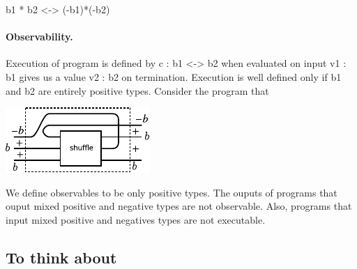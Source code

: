 \documentclass[preprint]{sigplanconf}
\begin{document}
{{b1 * b2 <-> (-b1)*(-b2)}}



\paragraph*{Observability.} 
Execution of program is defined by {{c : b1 <-> b2}} when evaluated on
input {{v1 : b1}} gives us a value {{v2 : b2}} on
termination. Execution is well defined only if {{b1}} and {{b2}} are
entirely positive types. Consider the program that

\begin{center}
  \includegraphics{diagrams/shuffle.pdf}
\end{center}

We define observables to be only positive types. The ouputs of
programs that ouput mixed positive and negative types are not
observable.  Also, programs that input mixed positive and negatives
types are not executable.

\subsection{To think about}
\end{document}
